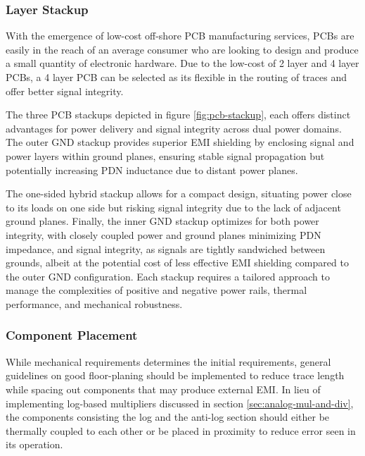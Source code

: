 \documentclass[10pt]{article}
\begin{document}
\begin{multicols*}{2}
                \subsubsection{Layer Stackup}
                    With the emergence of low-cost off-shore PCB manufacturing services, PCBs are easily in the reach of an average consumer who are looking to design and produce a small quantity of electronic hardware. Due to the low-cost of 2 layer and 4 layer PCBs, a 4 layer PCB can be selected as its flexible in the routing of traces and offer better signal integrity.\par
                    The three PCB stackups depicted in figure \ref{fig:pcb-stackup}, each offers distinct advantages for power delivery and signal integrity across dual power domains. The outer GND stackup provides superior EMI shielding by enclosing signal and power layers within ground planes, ensuring stable signal propagation but potentially increasing PDN inductance due to distant power planes.\par
                    The one-sided hybrid stackup allows for a compact design, situating power close to its loads on one side but risking signal integrity due to the lack of adjacent ground planes. Finally, the inner GND stackup optimizes for both power integrity, with closely coupled power and ground planes minimizing PDN impedance, and signal integrity, as signals are tightly sandwiched between grounds, albeit at the potential cost of less effective EMI shielding compared to the outer GND configuration. Each stackup requires a tailored approach to manage the complexities of positive and negative power rails, thermal performance, and mechanical robustness.

                \subsubsection{Component Placement}
                    While mechanical requirements determines the initial requirements, general guidelines on good floor-planing should be implemented to reduce trace length while spacing out components that may produce external EMI. In lieu of implementing log-based multipliers discussed in section \ref{sec:analog-mul-and-div}, the components consisting the log and the anti-log section should either be thermally coupled to each other or be placed in proximity to reduce error seen in its operation.
        

\end{multicols*}
\end{document}
